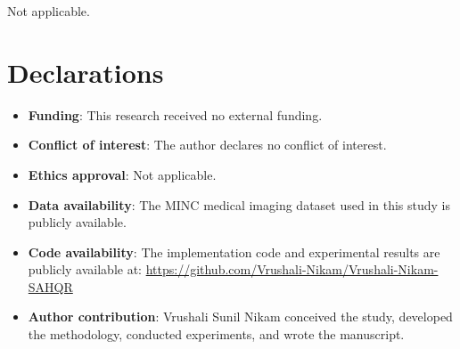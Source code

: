 \documentclass[pdflatex,sn-mathphys-num,Numbered]{sn-jnl}
\theoremstyle{thmstyleone}
\theoremstyle{thmstyletwo}
\theoremstyle{thmstylethree}
\begin{document}

\backmatter

Not applicable.

\section*{Declarations}

\begin{itemize}
\item \textbf{Funding}: This research received no external funding.
\item \textbf{Conflict of interest}: The author declares no conflict of interest.
\item \textbf{Ethics approval}: Not applicable.
\item \textbf{Data availability}: The MINC medical imaging dataset used in this study is publicly available.
\item \textbf{Code availability}: The implementation code and experimental results are publicly available at: \url{https://github.com/Vrushali-Nikam/Vrushali-Nikam-SAHQR}
\item \textbf{Author contribution}: Vrushali Sunil Nikam conceived the study, developed the methodology, conducted experiments, and wrote the manuscript.
\end{itemize}



\end{document}
